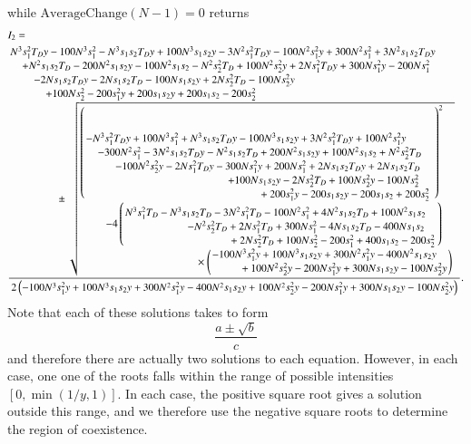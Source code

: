 \documentclass[a4paper]{article}
\begin{document}
   while $\text{AverageChange}(N-1)=0$ returns
   \begin{align}
   &I_2=\\
   & \frac{ \splitfrac{N^3 s_1^2 T_D y- 100 N^3 s_1^2- N^3 s_1 s_2 T_D y+ 100 N^3 s_1 s_2 y- 3 N^2
   s_1^2 T_D y -100 N^2 s_1^2 y+ 300 N^2 s_1^2+ 3 N^2 s_1 s_2 T_D y }{ \splitfrac{+N^2 s_1 s_2
   T_D-200 N^2 s_1 s_2 y- 100 N^2 s_1 s_2- N^2 s_2^2 T_D+ 100 N^2 s_2^2
   y+ 2 N s_1^2 T_D
   y+ 300 N s_1^2 y- 200 N s_1^2}{\splitfrac{-2N s_1 s_2 T_D y - 2 N s_1 s_2 T_D- 100 N s_1
   s_2 y+ 2 N s_2^2 T_D- 100 N s_2^2 y}{\splitfrac{+ 100 N s_2^2- 200 s_1^2 y+ 200 s_1 s_2
   y +200 s_1 s_2-200 s_2^2}{ \pm \sqrt{\splitfrac{ \left( \splitfrac{-N^3 s_1^2 T_D y+100 N^3 s_1^2+N^3 s_1 s_2 T_D y-100 N^3 s_1 s_2
   y+3 N^2 s_1^2 T_D y+100 N^2 s_1^2 y}{\splitfrac{-300 N^2 s_1^2-3 N^2 s_1 s_2 T_D y- N^2 s_1
   s_2 T_D+ 200 N^2 s_1 s_2 y+ 100 N^2 s_1 s_2+ N^2 s_2^2 T_D}{\splitfrac{- 100 N^2 s_2^2 y- 2
   N s_1^2 T_D y-300 N s_1^2 y+200 N s_1^2+2 N s_1 s_2 T_D y+2 N s_1 s_2
   T_D}{\splitfrac{+100 N s_1 s_2 y-2 N s_2^2 T_D+100 N s_2^2 y-100 N s_2^2}{+200 s_1^2 y-200
   s_1 s_2 y-200 s_1 s_2+200 s_2^2}}}}\right)^2}{\splitfrac{-4 \left(\splitfrac{N^3 s_1^2 T_D-N^3 s_1
   s_2 T_D-3 N^2 s_1^2 T_D-100 N^2 s_1^2+4 N^2 s_1 s_2 T_D+100 N^2 s_1 s_2}{\splitfrac{-N^2
   s_2^2 T_D+2 N s_1^2 T_D+300 N s_1^2-4 N s_1 s_2 T_D-400 N s_1 s_2}{+2 N
   s_2^2 T_D+100 N s_2^2-200 s_1^2+400 s_1 s_2-200 s_2^2}}\right)}{ \times \left(\splitfrac{-100 N^3
   s_1^2 y+100 N^3 s_1 s_2 y+300 N^2 s_1^2 y-400 N^2 s_1 s_2 y}{+100 N^2
   s_2^2 y-200 N s_1^2 y+300 N s_1 s_2 y-100 N s_2^2 y}\right)}}}}}}}}
   {2 \left(-100 N^3 s_1^2 y+100 N^3 s_1 s_2 y+300 N^2
   s_1^2 y-400 N^2 s_1 s_2 y+100 N^2 s_2^2 y-200 N s_1^2 y+300 N s_1 s_2
   y-100 N s_2^2 y\right)}.   \notag
   \end{align}
   Note that each of these solutions takes to form
   $$
  \frac{ a\pm \sqrt{b}}{c}
  $$
  and therefore there are actually two solutions to each equation. However, in each case, one one of the roots falls within the range of possible intensities $[0,\min(1/y,1)]$. In each case, the positive square root gives a solution outside this range, and we therefore use the negative square roots to determine the region of coexistence.
   
\end{document}
